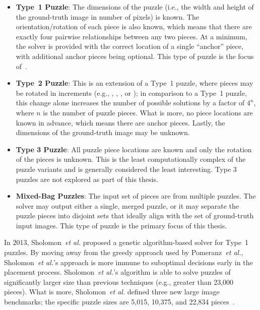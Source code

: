 \begin{itemize}

	\item \textbf{Type~1 Puzzle}: The dimensions of the puzzle (i.e., the width and height of the ground-truth image in number of pixels) is known.  The orientation/rotation of each piece is also known, which means that there are exactly four pairwise relationships between any two pieces.  At a minimum, the solver is provided with the correct location of a single ``anchor'' piece, with additional anchor pieces being optional.  This type of puzzle is the focus of~\cite{cho2010, pomeranz2011}.
	
	\item \textbf{Type~2 Puzzle}: This is an extension of a Type~1 puzzle, where pieces may be rotated in  increments (e.g., , , , or ); in comparison to a Type~1 puzzle, this change alone increases the number of possible solutions by a factor of $4^n$, where $n$ is the number of puzzle pieces.  What is more, no piece locations are known in advance, which means there are  anchor pieces.  Lastly, the dimensions of the ground-truth image may be unknown.
	
	\item \textbf{Type 3 Puzzle}: All puzzle piece locations are known and only the rotation of the pieces is unknown.  This is the least computationally complex of the puzzle variants and is generally considered the least interesting.  Type 3 puzzles are not explored as part of this thesis.
	
	\item \textbf{Mixed-Bag Puzzles}: The input set of pieces are from multiple puzzles.  The solver may output either a single, merged puzzle, or it may separate the puzzle pieces into disjoint sets that ideally align with the set of ground-truth input images.  This type of puzzle is the primary focus of this thesis.

\end{itemize}

In 2013, Sholomon~\textit{et al.}\cite{sholomon2013} proposed a genetic algorithm-based solver for Type~1 puzzles.  By moving away from the greedy approach used by Pomeranz~\textit{et al.}, Sholomon~\textit{et al.}'s approach is more immune to suboptimal decisions early in the placement process. Sholomon~\textit{et al.}'s algorithm is able to solve puzzles of significantly larger size than previous techniques (e.g., greater than 23,000 pieces).  What is more, Sholomon~\textit{et al.} defined three new large image benchmarks; the specific puzzle sizes are 5,015, 10,375, and 22,834 pieces~\cite{sholomonBenchmarkImages}.

